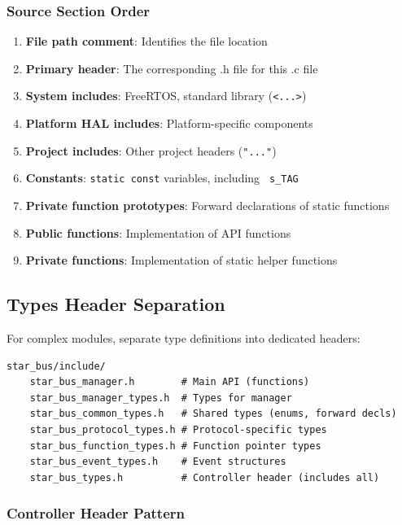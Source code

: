 \subsubsection{Source Section Order}

\begin{enumerate}
    \item \textbf{File path comment}: Identifies the file location
    \item \textbf{Primary header}: The corresponding .h file for this .c file
    \item \textbf{System includes}: FreeRTOS, standard library (\texttt{<...>})
    \item \textbf{Platform HAL includes}: Platform-specific components
    \item \textbf{Project includes}: Other project headers (\texttt{"..."})
    \item \textbf{Constants}: \texttt{static const} variables, including \texttt{
      s\_TAG}
    \item \textbf{Private function prototypes}: Forward declarations of static functions
    \item \textbf{Public functions}: Implementation of API functions
    \item \textbf{Private functions}: Implementation of static helper functions
\end{enumerate}

\subsection{Types Header Separation}

For complex modules, separate type definitions into dedicated headers:

\begin{verbatim}
star_bus/include/
    star_bus_manager.h        # Main API (functions)
    star_bus_manager_types.h  # Types for manager
    star_bus_common_types.h   # Shared types (enums, forward decls)
    star_bus_protocol_types.h # Protocol-specific types
    star_bus_function_types.h # Function pointer types
    star_bus_event_types.h    # Event structures
    star_bus_types.h          # Controller header (includes all)
\end{verbatim}

\subsubsection{Controller Header Pattern}

